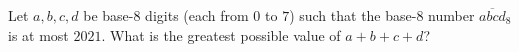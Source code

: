 Let $a,b,c,d$ be base-$8$ digits (each from $0$ to $7$) such that the base-$8$ number $\overline{abcd}_8$ is at most $2021$. What is the greatest possible value of $a+b+c+d$?

